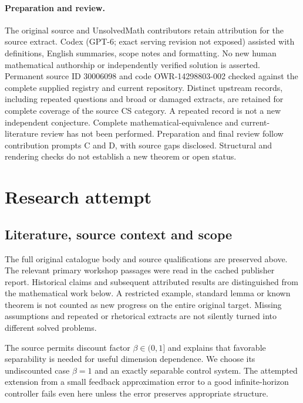 \documentclass[11pt]{article}
\begin{document}
\paragraph{Preparation and review.}
The original source and UnsolvedMath contributors retain attribution for the source extract. Codex (GPT-6; exact serving revision not exposed) assisted with definitions, English summaries, scope notes and formatting. No new human mathematical authorship or independently verified solution is asserted. Permanent source ID 30006098 and code OWR-14298803-002 checked against the complete supplied registry and current repository. Distinct upstream records, including repeated questions and broad or damaged extracts, are retained for complete coverage of the source CS category. A repeated record is not a new independent conjecture. Complete mathematical-equivalence and current-literature review has not been performed. Preparation and final review follow contribution prompts C and D, with source gaps disclosed. Structural and rendering checks do not establish a new theorem or open status.
\label{end:30006098}

\section{Research attempt}
\subsection{Literature, source context and scope}
The full original catalogue body and source qualifications are preserved above. The relevant primary workshop passages were read in the cached publisher report. Historical claims and subsequent attributed results are distinguished from the mathematical work below. A restricted example, standard lemma or known theorem is not counted as new progress on the entire original target. Missing assumptions and repeated or rhetorical extracts are not silently turned into different solved problems.

The source permits discount factor $\beta\in(0,1]$ and explains that favorable separability is needed for useful dimension dependence. We choose its undiscounted case $\beta=1$ and an exactly separable control system. The attempted extension from a small feedback approximation error to a good infinite-horizon controller fails even here unless the error preserves appropriate structure.
\end{document}
